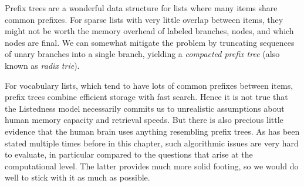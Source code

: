 \begin{programming}
Prefix trees are a wonderful data structure for lists where many items share common prefixes.
For sparse lists with very little overlap between items, they might not be worth the memory overhead of labeled branches, nodes, and which nodes are final.
We can somewhat mitigate the problem by truncating sequences of unary branches into a single branch, yielding a \emph{compacted prefix tree} (also known as \emph{radix trie}).
%
\begin{center}
    
\end{center}

For vocabulary lists, which tend to have lots of common prefixes between items, prefix trees combine efficient storage with fast search.
Hence it is not true that the Listedness model necessarily commits us to unrealistic assumptions about human memory capacity and retrieval speeds.
But there is also precious little evidence that the human brain uses anything resembling prefix trees.
As has been stated multiple times before in this chapter, such algorithmic issues are very hard to evaluate, in particular compared to the questions that arise at the computational level.
The latter provides much more solid footing, so we would do well to stick with it as much as possible.
\end{programming}
